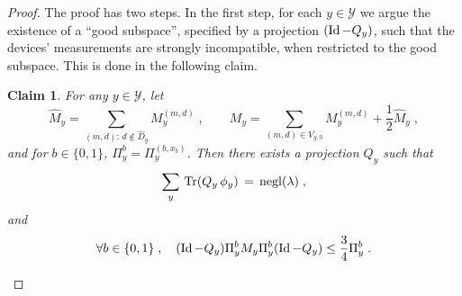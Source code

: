\documentclass[11pt]{article}
\newtheorem{claim}[theorem]{Claim}
\theoremstyle{remark}
\theoremstyle{definition}
\newcommand{\Tr}{\mbox{\rm Tr}}
\newcommand{\Id}{\ensuremath{\mathop{\rm Id}\nolimits}}
\newcommand{\mY}{\ensuremath{\mathcal{Y}}}
\DeclareMathOperator{\negl}{negl}
\begin{document}
\begin{proof}
The proof has two steps. In the first step, for each $y\in\mY$ we argue the existence of a ``good subspace'', specified by a projection $(\Id-Q_y)$, such that the devices' measurements are strongly incompatible, when restricted to the good subspace. This is done in the following claim. 

\begin{claim}
For any $y\in \mY$, let 
$$\hat{M}_y = \sum_{(m,d):\, d\notin \hat{D}_y} M_{y}^{(m,d)}\;,\qquad M_y = \sum_{(m,d) \in V_{y,0}} M_y^{(m,d)} + \frac{1}{2} \hat{M}_y\;,$$
and for $b \in\{0,1\}$, $\Pi_y^b = \Pi_y^{(b,x_b)}$.
Then there exists a projection $Q_y$ such that 
\begin{equation}\label{eq:q-negl2}
\sum_y \, \Tr(Q_y\,\phi_y)\,=\, \negl(\lambda)\;,
\end{equation} and
\begin{equation}\label{eq:q-norm-2}
\forall b\in\{0,1\}\;,\quad (\Id-Q_y)\Pi_y^b M_y \Pi_y^b (\Id-Q_y) \leq \frac{3}{4} \Pi_y^b\;.
\end{equation}
\end{claim}


\end{proof}
\end{document}
